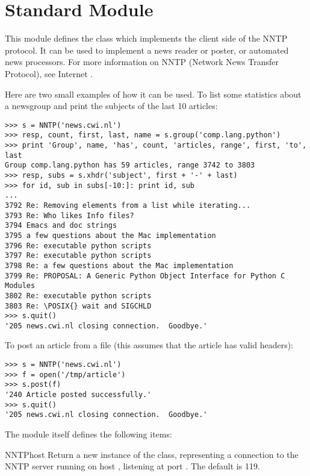\section{Standard Module }
\label{module-nntplib}


This module defines the class  which implements the client
side of the NNTP protocol.  It can be used to implement a news reader
or poster, or automated news processors.  For more information on NNTP
(Network News Transfer Protocol), see Internet .

Here are two small examples of how it can be used.  To list some
statistics about a newsgroup and print the subjects of the last 10
articles:

\begin{verbatim}
>>> s = NNTP('news.cwi.nl')
>>> resp, count, first, last, name = s.group('comp.lang.python')
>>> print 'Group', name, 'has', count, 'articles, range', first, 'to', last
Group comp.lang.python has 59 articles, range 3742 to 3803
>>> resp, subs = s.xhdr('subject', first + '-' + last)
>>> for id, sub in subs[-10:]: print id, sub
... 
3792 Re: Removing elements from a list while iterating...
3793 Re: Who likes Info files?
3794 Emacs and doc strings
3795 a few questions about the Mac implementation
3796 Re: executable python scripts
3797 Re: executable python scripts
3798 Re: a few questions about the Mac implementation 
3799 Re: PROPOSAL: A Generic Python Object Interface for Python C Modules
3802 Re: executable python scripts 
3803 Re: \POSIX{} wait and SIGCHLD
>>> s.quit()
'205 news.cwi.nl closing connection.  Goodbye.'
\end{verbatim}

To post an article from a file (this assumes that the article has
valid headers):

\begin{verbatim}
>>> s = NNTP('news.cwi.nl')
>>> f = open('/tmp/article')
>>> s.post(f)
'240 Article posted successfully.'
>>> s.quit()
'205 news.cwi.nl closing connection.  Goodbye.'
\end{verbatim}
%
The module itself defines the following items:

\begin{classdesc}{NNTP}{host}
Return a new instance of the  class, representing a
connection to the NNTP server running on host , listening at
port .  The default  is 119.
\end{classdesc}

